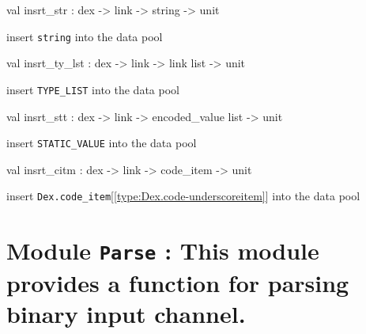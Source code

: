 \documentclass[11pt]{article}
\begin{document}
\label{val:Dex.insrt-underscorestr}\begin{ocamldoccode}
val insrt_str : dex -> link -> string -> unit
\end{ocamldoccode}
\begin{ocamldocdescription}
insert {\tt{string}} into the data pool


\end{ocamldocdescription}




\label{val:Dex.insrt-underscorety-underscorelst}\begin{ocamldoccode}
val insrt_ty_lst : dex -> link -> link list -> unit
\end{ocamldoccode}
\begin{ocamldocdescription}
insert {\tt{TYPE\_LIST}} into the data pool


\end{ocamldocdescription}




\label{val:Dex.insrt-underscorestt}\begin{ocamldoccode}
val insrt_stt : dex -> link -> encoded_value list -> unit
\end{ocamldoccode}
\begin{ocamldocdescription}
insert {\tt{STATIC\_VALUE}} into the data pool


\end{ocamldocdescription}




\label{val:Dex.insrt-underscorecitm}\begin{ocamldoccode}
val insrt_citm : dex -> link -> code_item -> unit
\end{ocamldoccode}
\begin{ocamldocdescription}
insert {\tt{Dex.code\_item}}[\ref{type:Dex.code-underscoreitem}] into the data pool


\end{ocamldocdescription}


\section{Module {\tt{Parse}} : This module provides a function for parsing binary input channel.}
\label{module:Parse}
\end{document}
